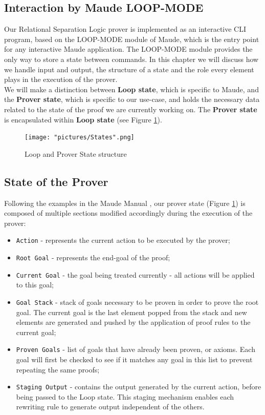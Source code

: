 \documentclass[12pt,a4paper]{article}
\begin{document}
\subsection{Interaction by Maude LOOP-MODE}
Our Relational Separation Logic prover is implemented as an interactive CLI program, based on the LOOP-MODE module of Maude, which is the entry point for any interactive Maude application. The LOOP-MODE module provides the only way to store a state between commands. In this chapter we will discuss how we handle input and output, the structure of a state and the role every element plays in the execution of the prover.\\

We will make a distinction between \textbf{Loop state}, which is specific to Maude, and the \textbf{Prover state}, which is specific to our use-case, and holds the necessary data related to the state of the proof we are currently working on. The \textbf{Prover state} is encapsulated within \textbf{Loop state} (see Figure \ref{fig:states}).
\begin{figure}[h]
	\texttt{[image: "pictures/States".png]}
	\caption{Loop and Prover State structure}
	\label{fig:states}
\end{figure}
\subsection{State of the Prover}
Following the examples in the Maude Manual \cite{manual}, our prover state (Figure \ref{fig:states}) is composed of multiple sections modified accordingly during the execution of the prover:
\begin{itemize}
	\item{\texttt{Action} - represents the current action to be executed by the prover;}
	\item{\texttt{Root Goal} - represents the end-goal of the proof;}
	\item{\texttt{Current Goal} - the goal being treated currently - all actions will be applied to this goal;}
	\item{\texttt{Goal Stack} - stack of goals necessary to be proven in order to prove the root goal. The current goal is the last element popped from the stack and new elements are generated and pushed by the application of proof rules to the current goal;}
	\item{\texttt{Proven Goals} - list of goals that have already been proven, or axioms. Each goal will first be checked to see if it matches any goal in this list to prevent repeating the same proofs;}
	\item{\texttt{Staging Output} - contains the output generated by the current action, before being passed to the Loop state. This staging mechanism enables each rewriting rule to generate output independent of the others.}
\end{itemize}
\end{document}
